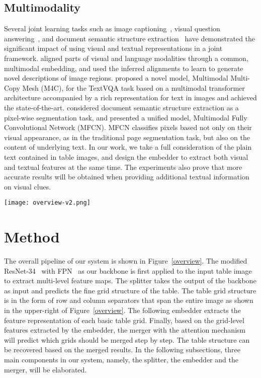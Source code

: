 \documentclass[review]{elsarticle}
\begin{document}
\subsection{Multimodality}
Several joint learning tasks such as image captioning~\cite{DSEN, ImageCaption-DVSA}, visual question answering~\cite{VQA-1, VQA-2, VQA-M4C}, and document semantic structure extraction~\cite{DSSE} have demonstrated the significant impact of using visual and textual representations in a joint framework. \cite{ImageCaption-DVSA} aligned parts of visual and language modalities through a common, multimodal embedding, and used the inferred alignments to learn to generate novel descriptions of image regions. \cite{VQA-M4C} proposed a novel model, Multimodal Multi-Copy Mesh (M4C), for the TextVQA task based on a multimodal transformer architecture accompanied by a rich representation for text in images and achieved the state-of-the-art. \cite{DSSE} considered document semantic structure extraction as a pixel-wise segmentation task, and presented a unified model, Multimodal Fully Convolutional Network (MFCN). MFCN classifies pixels based not only on their visual appearance, as in the traditional page segmentation task, but also on the content of underlying text. In our work, we take a full consideration of the plain text contained in table images, and design the embedder to extract both visual and textual features at the same time. The experiments also prove that more accurate results will be obtained when providing additional textual information on visual clues.

\begin{figure*}[htb]
	\centerline{\texttt{[image: overview-v2.png]}}
	\caption{\textbf{SEM pipeline} The backbone is applied to extract the feature maps from the table image. The splitter uses the backbone features to predict a set of basic table grids. The embedder extracts the region features corresponding to each basic table gird. The merger predicts which grid elements need to be merged to recover the table cells.}
	\label{overview}
\end{figure*}

\section{Method}
The overall pipeline of our system is shown in Figure~\ref{overview}. The modified ResNet-34~\cite{ResNet} with FPN~\cite{FPN} as our backbone is first applied to the input table image to extract multi-level feature maps. The splitter takes the output of the backbone as input and predicts the fine grid structure of the table. The table grid structure is in the form of row and column separators that span the entire image as shown in the upper-right of Figure~\ref{overview}. The following embedder extracts the feature representation of each basic table grid. Finally, based on the grid-level features extracted by the embedder, the merger with the attention mechanism will predict which grids should be merged step by step. The table structure can be recovered based on the merged results. In the following subsections, three main components in our system, namely, the splitter, the embedder and the merger, will be elaborated.
\end{document}

